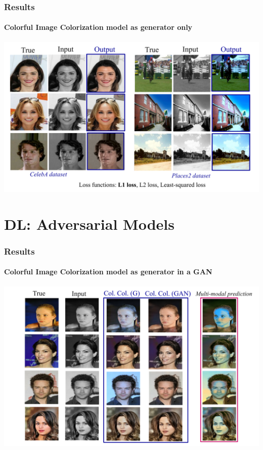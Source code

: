 \documentclass{beamer}
\begin{document}
\begin{frame}
\frametitle{\textbf{Results}}
\framesubtitle{\textbf{Colorful Image Colorization model as generator only}}
\includegraphics[width=\linewidth]{81.pdf}
\end{frame}

\section*{DL: Adversarial Models}
\begin{frame}
\frametitle{\textbf{Results}}
\framesubtitle{\textbf{Colorful Image Colorization model as generator in a GAN}}
\includegraphics[width=0.9 \linewidth]{82.pdf}
\end{frame}
\end{document}

